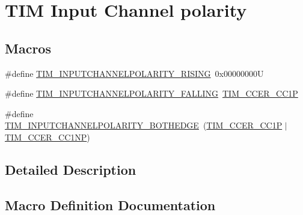 \hypertarget{group___t_i_m___input___channel___polarity}{}\section{T\+IM Input Channel polarity}
\label{group___t_i_m___input___channel___polarity}
\subsection*{Macros}
\begin{DoxyCompactItemize}
\item 
\#define \mbox{\hyperlink{group___t_i_m___input___channel___polarity_ga4f4cede88a4ad4b33e81f2567e9bb08f}{T\+I\+M\+\_\+\+I\+N\+P\+U\+T\+C\+H\+A\+N\+N\+E\+L\+P\+O\+L\+A\+R\+I\+T\+Y\+\_\+\+R\+I\+S\+I\+NG}}~0x00000000U
\item 
\#define \mbox{\hyperlink{group___t_i_m___input___channel___polarity_ga07441a8c0a52234e30f471c23803450c}{T\+I\+M\+\_\+\+I\+N\+P\+U\+T\+C\+H\+A\+N\+N\+E\+L\+P\+O\+L\+A\+R\+I\+T\+Y\+\_\+\+F\+A\+L\+L\+I\+NG}}~\mbox{\hyperlink{group___peripheral___registers___bits___definition_ga0ca0aedba14241caff739afb3c3ee291}{T\+I\+M\+\_\+\+C\+C\+E\+R\+\_\+\+C\+C1P}}
\item 
\#define \mbox{\hyperlink{group___t_i_m___input___channel___polarity_gaab2598881d1f19158e77723c5d29d6ac}{T\+I\+M\+\_\+\+I\+N\+P\+U\+T\+C\+H\+A\+N\+N\+E\+L\+P\+O\+L\+A\+R\+I\+T\+Y\+\_\+\+B\+O\+T\+H\+E\+D\+GE}}~(\mbox{\hyperlink{group___peripheral___registers___bits___definition_ga0ca0aedba14241caff739afb3c3ee291}{T\+I\+M\+\_\+\+C\+C\+E\+R\+\_\+\+C\+C1P}} $\vert$ \mbox{\hyperlink{group___peripheral___registers___bits___definition_ga403fc501d4d8de6cabee6b07acb81a36}{T\+I\+M\+\_\+\+C\+C\+E\+R\+\_\+\+C\+C1\+NP}})
\end{DoxyCompactItemize}


\subsection{Detailed Description}


\subsection{Macro Definition Documentation}
\mbox{\label{group___t_i_m___input___channel___polarity_gaab2598881d1f19158e77723c5d29d6ac}} 
